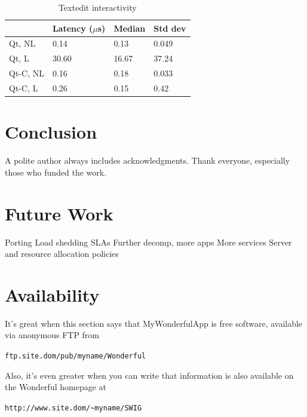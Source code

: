\documentclass[letterpaper,twocolumn,10pt]{article}
\begin{document}
\begin{table}[htp]
\caption{Textedit interactivity}
\label{tab:textedit_table}
\centering
\begin{tabular}{|l | l | l | l |}
\hline
	&Latency ($\mu$s)	&Median	&Std dev\\ \hline
Qt, NL	&0.14	&0.13	&0.049\\
Qt, L	&30.60	&16.67	&37.24\\
Qt-C, NL	&0.16	&0.18	&0.033\\
Qt-C, L	&0.26	&0.15	&0.42\\
\hline
\end{tabular}
\end{table}

\section{Conclusion}

A polite author always includes acknowledgments.  Thank everyone,
especially those who funded the work. 

\section{Future Work}
Porting
Load shedding
SLAs
Further decomp, more apps
More services
Server and resource allocation policies

\section{Availability}

It's great when this section says that MyWonderfulApp is free software, 
available via anonymous FTP from

\begin{center}
{\tt ftp.site.dom/pub/myname/Wonderful}\\
\end{center}

Also, it's even greater when you can write that information is also 
available on the Wonderful homepage at 

\begin{center}
{\tt http://www.site.dom/\~{}myname/SWIG}
\end{center}

\footnotesize{
}

\theendnotes
\end{document}
